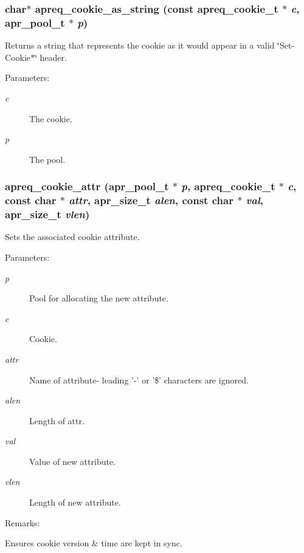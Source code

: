 \subsubsection{\setlength{\rightskip}{0pt plus 5cm}char$\ast$ apreq\_\-cookie\_\-as\_\-string (const {\bf apreq\_\-cookie\_\-t} $\ast$ {\em c}, {\bf apr\_\-pool\_\-t} $\ast$ {\em p})}\label{group__cookies_a7}


Returns a string that represents the cookie as it would appear  in a valid \char`\"{}Set-Cookie$\ast$\char`\"{} header.\begin{Desc}
\item[Parameters: ]\par
\begin{description}
\item[{\em 
c}]The cookie. \item[{\em 
p}]The pool. \end{description}
\end{Desc}
\subsubsection{ apreq\_\-cookie\_\-attr ({\bf apr\_\-pool\_\-t} $\ast$ {\em p}, {\bf apreq\_\-cookie\_\-t} $\ast$ {\em c}, const char $\ast$ {\em attr}, {\bf apr\_\-size\_\-t} {\em alen}, const char $\ast$ {\em val}, {\bf apr\_\-size\_\-t} {\em vlen})}\label{group__cookies_a6}


Sets the associated cookie attribute. \begin{Desc}
\item[Parameters: ]\par
\begin{description}
\item[{\em 
p}]Pool for allocating the new attribute. \item[{\em 
c}]Cookie. \item[{\em 
attr}]Name of attribute- leading '-' or '\$' characters are ignored. \item[{\em 
alen}]Length of attr. \item[{\em 
val}]Value of new attribute. \item[{\em 
vlen}]Length of new attribute. \end{description}
\end{Desc}
\begin{Desc}
\item[Remarks: ]\par
Ensures cookie version \& time are kept in sync. \end{Desc}
